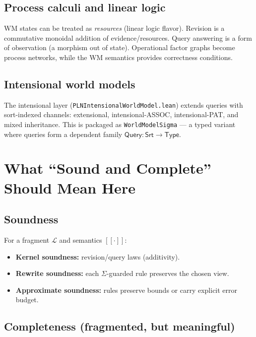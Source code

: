 \documentclass[]{article}
\newcommand{\code}[1]{\texttt{#1}}
\newcommand{\Query}{\mathsf{Query}}
\begin{document}
\subsection{Process calculi and linear logic}

WM states can be treated as \emph{resources} (linear logic flavor).
Revision is a commutative monoidal addition of evidence/resources. Query
answering is a form of observation (a morphism out of state). Operational
factor graphs become process networks, while the WM semantics provides
correctness conditions.

\subsection{Intensional world models}

The intensional layer (\code{PLNIntensionalWorldModel.lean}) extends
queries with sort-indexed channels: extensional, intensional-ASSOC,
intensional-PAT, and mixed inheritance. This is packaged as
\code{WorldModelSigma} --- a typed variant where queries form a dependent
family $\Query : \mathsf{Srt} \to \mathsf{Type}$.


\section{What ``Sound and Complete'' Should Mean Here}
\label{sec:metatheory}

\subsection{Soundness}

For a fragment $\mathcal{L}$ and semantics $[\![\cdot]\!]$:
\begin{itemize}[leftmargin=2em]
\item \textbf{Kernel soundness:} revision/query laws (additivity).
\item \textbf{Rewrite soundness:} each $\Sigma$-guarded rule preserves
  the chosen view.
\item \textbf{Approximate soundness:} rules preserve bounds or carry
  explicit error budget.
\end{itemize}

\subsection{Completeness (fragmented, but meaningful)}
\end{document}
